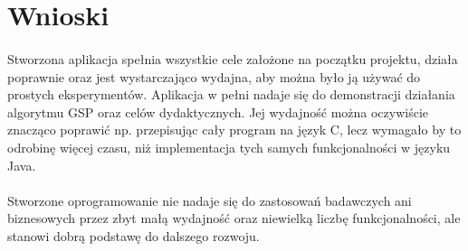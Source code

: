 \documentclass[11pt,a4paper]{article}
\begin{document}
\section{Wnioski}
\paragraph{}Stworzona aplikacja spełnia wszystkie cele założone na początku projektu, działa poprawnie oraz jest wystarczająco wydajna, aby można było ją używać do prostych eksperymentów. Aplikacja w pełni nadaje się do demonstracji działania algorytmu GSP oraz celów dydaktycznych. Jej wydajność można oczywiście znacząco poprawić np. przepisując cały program na język C, lecz wymagało by to odrobinę więcej czasu, niż implementacja tych samych funkcjonalności w języku Java.
\paragraph{}Stworzone oprogramowanie nie nadaje się do zastosowań badawczych ani biznesowych przez zbyt małą wydajność oraz niewielką liczbę funkcjonalności, ale stanowi dobrą podstawę do dalszego rozwoju.

\nocite{*}


\end{document}

